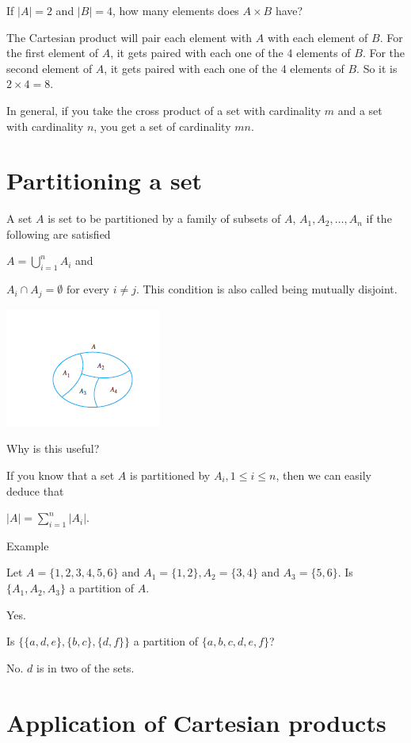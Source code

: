 \documentclass[12pt]{article}
\begin{document}
If $|A| = 2$ and $|B| = 4$, how many elements does $A \times B$ have?

The Cartesian product will pair each element with $A$ with each element of $B$. For the first element of $A$, it gets paired with each one of the 4 elements of $B$. For the second element of $A$, it gets paired with each one of the 4 elements of $B$. So it is $ 2 \times 4 = 8$.

In general, if you take the cross product of a set with cardinality $m$ and a set with cardinality $n$, you get a set of cardinality $mn$.

\section*{Partitioning a set}

A set $A$ is set to be partitioned by a family of subsets of $A$, $A_1, A_2, \ldots, A_n$ if the following are satisfied

$\displaystyle A = \bigcup_{i=1}^n A_i$ and

$\displaystyle A_i \cap A_j = \emptyset \text{ for every } i \neq j$. This condition is also called being mutually disjoint.

\includegraphics{./img/partition.png}

Why is this useful?

If you know that a set $A$ is partitioned by $A_i, 1 \le i \le n$, then we can easily deduce that

$\displaystyle |A| = \sum_{i=1}^n |A_i|$.

Example

Let $A = \{1,2,3,4,5,6\} \text{ and } A_1 = \{1,2\}, A_2 = \{3,4\} \text{ and } A_3 = \{5,6\}$. Is $\{A_1, A_2, A_3\}$ a partition of $A$.

Yes. 

Is $\{\{a,d,e\},\{b,c\},\{d,f\}\}$ a partition of $\{a,b,c,d,e,f\}$?

No. $d$ is in two of the sets.



\section*{Application of Cartesian products}
\end{document}
